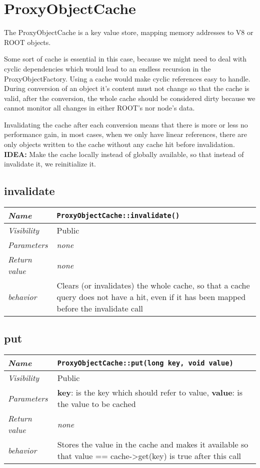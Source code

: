 \chapter{ProxyObjectCache}
The ProxyObjectCache is a key value store, mapping memory addresses to V8 or ROOT objects.

Some sort of cache is essential in this case, because we might need to deal with cyclic dependencies which would lead to an endless recursion in the ProxyObjectFactory.
Using a cache would make cyclic references easy to handle. During conversion of an object it's content must not change so that the cache is valid, after the conversion, the whole cache should be considered dirty because we cannot monitor all changes in either ROOT's nor node's data.

Invalidating the cache after each conversion means that there is more or less no performance gain, in most cases, when we only have linear references, there are only objects written to the cache without any cache hit before invalidation.
\\
\textbf{IDEA:} Make the cache locally instead of globally available, so that instead of invalidate it, we reinitialize it.
\section{invalidate}
\begin{longtable}{p{3cm} @{\hskip 1cm} p{12cm}}
  \hline
  \textit{Name} & \texttt{ProxyObjectCache::invalidate()} \\
  \hline
  \textit{Visibility} & Public \\
  \hline
  \textit{Parameters} & \textit{none} \\
  \hline
  \textit{Return value} & \textit{none} \\
  \hline
  \textit{behavior} & Clears (or invalidates) the whole cache, so that a cache query does not have a hit, even if it has been mapped before the invalidate call \\
  \hline
\end{longtable}
\newpage
\section{put}
\begin{longtable}{p{3cm} @{\hskip 1cm} p{12cm}}
  \hline
  \textit{Name} & \texttt{ProxyObjectCache::put(long key, void value)} \\
  \hline
  \textit{Visibility} & Public \\
  \hline
  \textit{Parameters} & \textbf{key}: is the key which should refer to value, \textbf{value}: is the value to be cached\\
  \hline
  \textit{Return value} & \textit{none} \\
  \hline
  \textit{behavior} & Stores the value in the cache and makes it available so that value == cache->get(key) is true after this call \\
  \hline
\end{longtable}
\newpage
